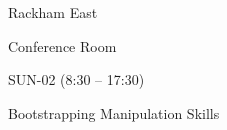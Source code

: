 \documentclass{article}
\begin{document}
\rssheader[2in]

\rssbig
\begin{center}
Rackham East \par \noindent Conference Room
\end{center}

\vfill

\rssmed
\begin{center}
SUN-02 (8:30 -- 17:30)
\end{center}

\rsssm
\begin{center}
Bootstrapping Manipulation Skills
\end{center}

\vfill
\end{document}
